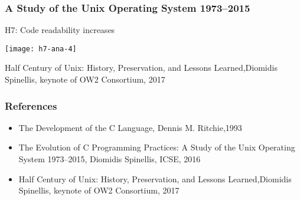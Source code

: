 \begin{frame}[plain]
	\frametitle{A Study of the Unix Operating System 1973–2015}
	\centering
	H7: Code readability increases
	
	\texttt{[image: h7-ana-4]}
	
	\tiny Half Century of Unix:
	History, Preservation, and
	Lessons Learned,Diomidis Spinellis, keynote of OW2 Consortium, 2017
	
\end{frame}


\begin{frame}[plain]
	\frametitle{References}
	
	\begin{itemize}
		\item The Development of the C Language, Dennis M. Ritchie,1993

		\item The Evolution of C Programming Practices:
		A Study of the Unix Operating System 1973–2015, Diomidis Spinellis,
		ICSE, 2016
		
		\item Half Century of Unix:
		History, Preservation, and
		Lessons Learned,Diomidis Spinellis, keynote of OW2 Consortium, 2017
		
	\end{itemize}
	
	
\end{frame}
